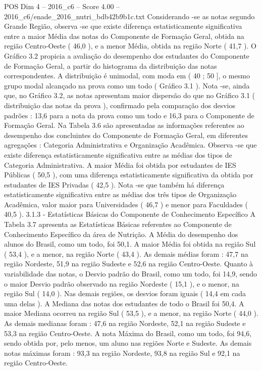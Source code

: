\begin{textsample}{POS Dim 4 – 2016\_c6 – Score 4.00 – 2016\_c6/enade\_2016\_nutri\_bdb42b9b1c.txt}
Considerando -se as notas segundo Grande Região, observa -se que existe diferença estatisticamente significativa entre a maior Média das notas do Componente de Formação Geral, obtida na região Centro-Oeste ( 46,0 ), e a menor Média, obtida na região Norte ( 41,7 ).
O Gráfico 3.2 propicia a avaliação do desempenho dos estudantes do Componente de Formação Geral, a partir do histograma da distribuição das notas correspondentes.
A distribuição é unimodal, com moda em ( 40 ; 50 ], o mesmo grupo modal alcançado na prova como um todo ( Gráfico 3.1 ).
Nota -se, ainda que, no Gráfico 3.2, as notas apresentam maior dispersão do que no Gráfico 3.1 ( distribuição das notas da prova ), confirmado pela comparação dos desvios padrões : 13,6 para a nota da prova como um todo e 16,3 para o Componente de Formação Geral.
Na Tabela 3.6 são apresentadas as informações referentes ao desempenho dos concluintes do Componente de Formação Geral, em diferentes agregações : Categoria Administrativa e Organização Acadêmica.
Observa -se que existe diferença estatisticamente significativa entre as médias dos tipos de Categoria Administrativa.
A maior Média foi obtida por estudantes de IES Públicas ( 50,5 ), com uma diferença estatisticamente significativa da obtida por estudantes de IES Privadas ( 42,5 ).
Nota -se que também há diferença estatisticamente significativa entre as médias dos três tipos de Organização Acadêmica, valor maior para Universidades ( 46,7 ) e menor para Faculdades ( 40,5 ). 3.1.3 - Estatísticas Básicas do Componente de Conhecimento Específico A Tabela 3.7 apresenta as Estatísticas Básicas referentes ao Componente de Conhecimento Específico da área de Nutrição.
A Média do desempenho dos alunos do Brasil, como um todo, foi 50,1.
A maior Média foi obtida na região Sul ( 53,4 ), e a menor, na região Norte ( 43,4 ).
As demais médias foram : 47,7 na região Nordeste, 51,9 na região Sudeste e 52,6 na região Centro-Oeste.
Quanto à variabilidade das notas, o Desvio padrão do Brasil, como um todo, foi 14,9, sendo o maior Desvio padrão observado na região Nordeste ( 15,1 ), e o menor, na região Sul ( 14,0 ).
Nas demais regiões, os desvios foram iguais ( 14,4 em cada uma delas ).
A Mediana das notas dos estudantes de todo o Brasil foi 50,4.
A maior Mediana ocorreu na região Sul ( 53,5 ), e a menor, na região Norte ( 44,0 ).
As demais medianas foram : 47,6 na região Nordeste, 52,1 na região Sudeste e 53,3 na região Centro-Oeste.
A nota Máxima do Brasil, como um todo, foi 94,6, sendo obtida por, pelo menos, um aluno nas regiões Norte e Sudeste.
As demais notas máximas foram : 93,3 na região Nordeste, 93,8 na região Sul e 92,1 na região Centro-Oeste.

\end{textsample}
